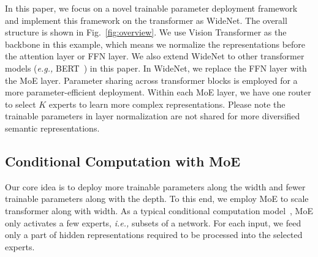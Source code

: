 \documentclass[letterpaper]{article} %
\newcommand{\ie}{\emph{i.e.,}\xspace}
\newcommand{\eg}{\emph{e.g.,}\xspace}
\def\revise{\textcolor{red}}
\begin{document}
In this paper, we focus on a novel trainable parameter deployment framework and implement this framework on the transformer as WideNet. The overall structure is shown in Fig.~\ref{fig:overview}. We use Vision Transformer as the backbone in this example, which means we normalize the representations before the attention layer or FFN layer. We also extend WideNet to other transformer models (\eg BERT~\cite{devlin-etal-2019-bert}) in this paper. In WideNet, we replace the FFN layer with the MoE layer. Parameter sharing across transformer blocks is employed for a more parameter-efficient deployment. Within each MoE layer, we have one router to select $K$ experts to learn more complex representations. Please note the trainable parameters in layer normalization are not shared for more diversified semantic representations.












\subsection{Conditional Computation with MoE}


Our core idea is to deploy more trainable parameters along the width and fewer trainable parameters along with the depth. To this end, we employ MoE to scale transformer along with width. As a typical conditional computation model~\citep{bengio2013deep}, MoE only activates a few experts, \ie subsets of a network. For each input, we feed only a part of hidden representations required to be processed into the selected experts. 

\end{document}
